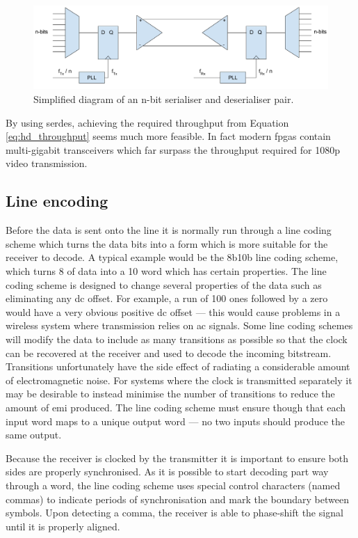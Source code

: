 \begin{figure}
  \centering
  \includegraphics[width=1\textwidth]{./img/serdes.png}
  \caption{Simplified diagram of an n-bit serialiser and deserialiser pair.}
  \label{fig:serdes_diagram}
\end{figure}

By using \gls{serdes}, achieving the required throughput from Equation \ref{eq:hd_throughput} seems much more feasible. In fact modern \glspl{fpga} contain multi-gigabit transceivers which far surpass the throughput required for 1080p video transmission.

\subsection{Line encoding}
Before the data is sent onto the line it is normally run through a line coding scheme which turns the data bits into a form which is more suitable for the receiver to decode. A typical example would be the 8b10b line coding scheme, which turns \SI{8}{\bit} of data into a \SI{10}{\bit} word which has certain properties. The line coding scheme is designed to change several properties of the data such as eliminating any \gls{dc} offset. For example, a run of 100 ones followed by a zero would have a very obvious positive \gls{dc} offset --- this would cause problems in a wireless system where transmission relies on \gls{ac} signals. Some line coding schemes will modify the data to include as many transitions as possible so that the clock can be recovered at the receiver and used to decode the incoming bitstream. Transitions unfortunately have the side effect of radiating a considerable amount of electromagnetic noise. For systems where the clock is transmitted separately it may be desirable to instead minimise the number of transitions to reduce the amount of \gls{emi} produced. The line coding scheme must ensure though that each input word maps to a unique output word --- no two inputs should produce the same output.

Because the receiver is clocked by the transmitter it is important to ensure both sides are properly synchronised. As it is possible to start decoding part way through a word, the line coding scheme uses special control characters (named commas) to indicate periods of synchronisation and mark the boundary between symbols. Upon detecting a comma, the receiver is able to phase-shift the signal until it is properly aligned. 

